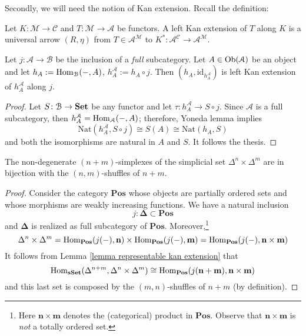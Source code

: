 \begin{refsection}
Secondly, we will need the notion of Kan extension. Recall the definition:

\begin{defin}
Let $K \colon \mathcal M \to \mathcal C$ and $T \colon \mathcal M \to \mathcal A$ be functors. A left Kan extension of $T$ along $K$ is a universal arrow $(R,\eta)$ from $T \in \mathcal A^{\mathcal M}$ to $K^* \colon \mathcal A^{\mathcal C} \to \mathcal A^{\mathcal M}$.
\end{defin}

\begin{lemma} \label{lemma representable kan extension}
Let $j \colon \mathcal A \to \mathcal B$ be the inclusion of a \emph{full} subcategory. Let $A \in \operatorname{Ob}(\mathcal A)$ be an object and let $h_A := \mathrm{Hom}_{\mathcal B}(-,A)$, $h_A^{\mathcal A} := h_A \circ j$. Then $(h_A, \mathrm{id}_{h_A^{\mathcal A}})$ is left Kan extension of $h_A^{\mathcal A}$ along $j$.
\end{lemma}

\begin{proof}
Let $S \colon \mathcal B \to \mathbf{Set}$ be any functor and let $\tau \colon h_A^{\mathcal A} \to S \circ j$. Since $\mathcal A$ is a full subcategory, then $h_A^{\mathcal A} = \mathrm{Hom}_{\mathcal A}(-,A)$; therefore, Yoneda lemma implies
\[
\mathrm{Nat}(h_A^{\mathcal A}, S \circ j) \cong S(A) \cong \mathrm{Nat}(h_A, S)
\]
and both the isomorphisms are natural in $A$ and $S$. It follows the thesis.
\end{proof}

\begin{cor}
The non-degenerate $(n+m)$-simplexes of the simplicial set $\Delta^n \times \Delta^m$ are in bijection with the $(n,m)$-shuffles of $n+m$.
\end{cor}

\begin{proof}
Consider the category $\mathbf{Pos}$ whose objects are partially ordered sets and whose morphisms are weakly increasing functions. We have a natural inclusion
\[
j \colon \mathbf \Delta \subset \mathbf{Pos}
\]
and $\mathbf \Delta$ is realized as full subcategory of $\mathbf{Pos}$. Moreover,\footnote{Here $\mathbf n \times \mathbf m$ denotes the (categorical) product in $\mathbf{Pos}$. Observe that $\mathbf n \times \mathbf m$ is \emph{not} a totally ordered set.}
\[
\Delta^n \times \Delta^m = \mathrm{Hom}_{\mathbf{Pos}}(j(-), \mathbf n) \times \mathrm{Hom}_{\mathbf{Pos}}(j(-),\mathbf m) = \mathrm{Hom}_{\mathbf{Pos}}(j(-),\mathbf n \times \mathbf m)
\]
It follows from Lemma \ref{lemma representable kan extension} that
\[
\mathrm{Hom}_{\mathbf{sSet}}(\Delta^{n+m}, \Delta^n \times \Delta^m) \cong \mathrm{Hom}_{\mathbf{Pos}}(j(\mathbf{n + m}), \mathbf n \times \mathbf m)
\]
and this last set is composed by the $(m,n)$-shuffles of $n+m$ (by definition).
\end{proof}


\end{refsection}
